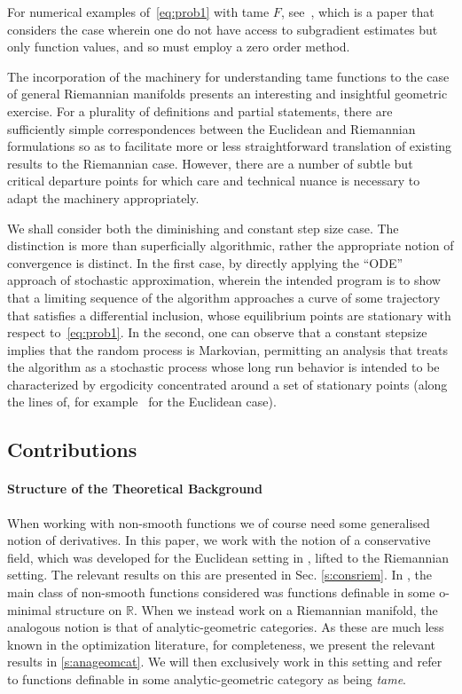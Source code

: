 \documentclass{article}
\newcommand{\BR}{\mathbb{R}}
\begin{document}
For numerical examples of~\eqref{eq:prob1} with tame $F$, see~\cite{kungurtsev2022retraction}, which is a paper that considers the case wherein one do not have access to subgradient estimates but only function values, and so must employ a zero order method. 

The incorporation of the machinery for understanding tame functions to the case of general Riemannian manifolds presents an interesting and insightful geometric exercise. For a plurality of definitions and partial statements, there are sufficiently simple correspondences between the Euclidean and Riemannian formulations so as to facilitate more or less straightforward translation of existing results to the Riemannian case. However, there are a number of subtle but critical departure points for which care and technical nuance is necessary to adapt the machinery appropriately. 

We shall consider both the diminishing and constant step size case. The distinction is more than superficially algorithmic, rather the appropriate notion of convergence is distinct. In the first case, by directly applying the ``ODE'' approach of stochastic approximation, wherein the intended program is to show that a limiting sequence of the algorithm approaches a curve of some trajectory that satisfies a differential inclusion, whose equilibrium points are stationary with respect to~\eqref{eq:prob1}. In the second, one can observe that a constant stepsize implies that the random process is Markovian, permitting an analysis that treats the algorithm as a stochastic process whose long run behavior is intended to be characterized by ergodicity concentrated around a set of stationary points (along the lines of, for example~\cite{bianchi2022convergence} for the Euclidean case). 


\subsection{Contributions}



\paragraph{Structure of the Theoretical Background} 
When working with non-smooth functions we of course need some generalised notion of derivatives. In this paper, we work with the notion of a conservative field, which was developed for the Euclidean setting in \cite{bolte2021conservative}, lifted to the Riemannian setting. The relevant results on this are presented in Sec. \ref{s:consriem}. In \cite{bolte2021conservative}, the main class of non-smooth functions considered was functions definable in some o-minimal structure on $\BR$. When we instead work on a Riemannian manifold, the analogous notion is that of analytic-geometric categories. As these are much less known in the optimization literature, for completeness, we present the relevant results in \ref{s:anageomcat}. We will then exclusively work in this setting and refer to functions definable in some analytic-geometric category as being \emph{tame}. 
\end{document}
